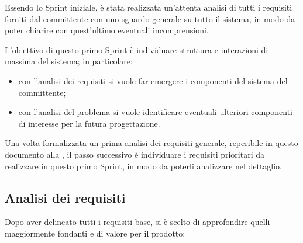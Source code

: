 

Essendo lo Sprint iniziale, è stata realizzata un'attenta analisi di tutti i requisiti forniti dal committente
con uno sguardo generale su tutto il sistema, in modo da poter chiarire con quest'ultimo eventuali incomprensioni.

L'obiettivo di questo primo Sprint è individuare struttura e interazioni di massima del sistema; in particolare:
\begin{itemize}
  \item
    con l'analisi dei requisiti si vuole far emergere i componenti del sistema del committente;
  \item
    con l'analisi del problema si vuole identificare eventuali ulteriori componenti di interesse per la futura progettazione.
\end{itemize}

Una volta formalizzata un prima analisi dei requisiti generale, reperibile in questo documento alla ,
il passo successivo è individuare i requisiti prioritari da realizzare in questo primo Sprint, in modo da poterli analizzare nel dettaglio.

\subsection{Analisi dei requisiti}

Dopo aver delineato tutti i requisiti base, si è scelto di approfondire quelli maggiormente fondanti e di valore per il prodotto:

